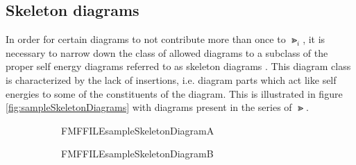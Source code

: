 \subsection{Skeleton diagrams}

In order for certain diagrams to not contribute more than once to $ \Gt_i $, it is necessary to narrow down the class of allowed diagrams to a subclass of the proper self energy diagrams referred to as skeleton diagrams \cite{mattuck2012guide}. This diagram class is characterized by the lack of insertions, i.e. diagram parts which act like self energies to some of the constituents of the diagram. This is illustrated in figure \ref{fig:sampleSkeletonDiagrams} with diagrams present in the series of $ \Gt $.

\begin{figure}[H]
	\centering
	\begin{subfigure}[b]{0.499\textwidth}%
		\begin{center}
			\begin{fmffile}{FMFFILEsampleSkeletonDiagramA}%
			\end{fmffile}%
		\end{center}
	\end{subfigure}\hfill
	\begin{subfigure}[b]{0.499\textwidth}
		\begin{center}
			\begin{fmffile}{FMFFILEsampleSkeletonDiagramB}
			\end{fmffile}%

\end{center}
\end{subfigure}
\end{figure}
